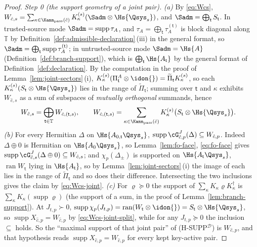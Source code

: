 \begin{proof}
\emph{Step 0 (the support geometry of a joint pair).} \emph{(a)} By
\eqref{eq:Wcs}, $W_{\hat c,s}=\sum_{\kappa\in\Kann_{\mathrm{pass}}(\hat c)}
K^{(s)}_{\kappa}(\Sadm\otimes\Hs{\Qsys_s})$, and
$\Sadm=\bigoplus_{\mathsf t}S_{\mathsf t}$. In trusted-source mode
$\Sadm=\operatorname{supp}\tau_A$, and
$\tau_A=\bigoplus_{\mathsf t}\tau^{(\mathsf t)}_A$ is block
diagonal along $\mathbb{T}$ by Definition~\ref{def:admissible-declaration}\,(iii) in the general
format, so $\Sadm=\bigoplus_{\mathsf t}\operatorname{supp}
\tau^{(\mathsf t)}_A$; in untrusted-source mode $\Sadm=\Hs{A}$
(Definition~\ref{def:branch-support}), which is
$\bigoplus_{\mathsf t}\Hs{A_{\mathsf t}}$ by the general format of
Definition~\ref{def:declaration}. By the computation in the proof of
Lemma~\ref{lem:joint-sectors}\,(i),
$K^{(s)}_{\kappa}(\Pi^{A}_{\mathsf t}\otimes\idon{})
=\widetilde\Pi_{\mathsf t}K^{(s)}_{\kappa}$, so each
$K^{(s)}_{\kappa}(S_{\mathsf t}\otimes
\Hs{\Qsys_s})$ lies in the range of $\widetilde\Pi_{\mathsf t}$; summing over
$\mathsf t$ and $\kappa$ exhibits $W_{\hat c,s}$ as a sum of subspaces of
\emph{mutually orthogonal} summands, hence
\begin{equation}\label{eq:Wcs-joint-split}
  W_{\hat c,s}=\bigoplus_{\mathsf t\in\mathbb{T}}W_{\hat c,(\mathsf t,s)},
  \qquad
  W_{\hat c,(\mathsf t,s)}=\sum_{\kappa\in\Kann_{\mathrm{pass}}(\hat c)}
  K^{(s)}_{\kappa}\big(S_{\mathsf t}\otimes
  \Hs{\Qsys_s}\big).
\end{equation}
\emph{(b)} For every Hermitian $\Delta$ on $\Hs{A_{0,\mathsf t}\Qsys_s}$,
$\operatorname{supp}\cG^{J}_{\hat c,p}(\Delta)\subseteq W_{\hat c,p}$. Indeed
$\Delta\oplus0$ is Hermitian on $\Hs{A_0\Qsys_s}$, so
Lemma~\ref{lem:fo-face}, \eqref{eq:fo-face} gives
$\operatorname{supp}\cG^{J}_{\hat c,s}(\Delta\oplus0)\subseteq W_{\hat c,s}$;
and $\chi_p(\Delta_{\pm})$ is supported on
$\Hs{A_{\mathsf t}\Qsys_s}$, $\operatorname{ran}W_{\mathsf t}$ lying in
$\Hs{A_{\mathsf t}}$, so by
Lemma~\ref{lem:joint-sectors}\,(i) the image of each lies in the
range of $\widetilde\Pi_{\mathsf t}$ and so does their difference. Intersecting
the two inclusions gives the claim by \eqref{eq:Wcs-joint}. \emph{(c)} For
$\varrho\succeq0$ the support of $\sum_{\kappa}K_{\kappa}\varrho
K_{\kappa}^{\dagger}$ is $\sum_{\kappa}K_{\kappa}(\operatorname{supp}\varrho)$
(the support of a sum, in the proof of Lemma~\ref{lem:branch-support}). At
$J_{t,p}\succ0$, $\operatorname{supp}\chi_p(J_{t,p})
=\operatorname{ran}(W_{\mathsf t}\otimes\idon{})
=S_{\mathsf t}\otimes\Hs{\Qsys_s}$, so
$\operatorname{supp}X_{\hat c,p}=W_{\hat c,p}$ by
\eqref{eq:Wcs-joint-split}, while for any $J_{t,p}\succeq0$ the inclusion
$\subseteq$ holds. So the ``maximal support of that joint pair'' of
(H-SUPP$^{\mathcal{D}}$) is $W_{\hat c,p}$, and that hypothesis reads
$\operatorname{supp}X_{\hat c,p}=W_{\hat c,p}$ for every kept key-active pair.


\end{proof}
